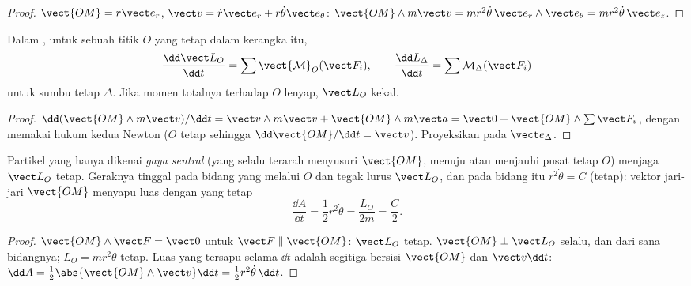 \begin{proof}
$\vect{OM} = r\vect e_r$, $\vect v = \dot r\vect e_r + r\dot\theta\vect e_\theta$:
$\vect{OM}\wedge m\vect v = mr^2\dot\theta\,\vect e_r\wedge\vect e_\theta = mr^2\dot\theta\,\vect e_z$.
\end{proof}

\begin{theorem}\label{thm:b1:angular-momentum:theorem}
Dalam , untuk sebuah titik $O$ yang tetap dalam
kerangka itu,
\[
\frac{\dd\vect L_O}{\dd t} = \sum\vect{\mathcal M}_O(\vect F_i),
\qquad
\frac{\dd L_\Delta}{\dd t} = \sum\mathcal M_\Delta(\vect F_i)
\]
untuk sumbu tetap $\Delta$. Jika momen totalnya terhadap $O$ lenyap,
$\vect L_O$ kekal.
\end{theorem}

\begin{proof}
$\dd(\vect{OM}\wedge m\vect v)/\dd t = \vect v\wedge m\vect v + \vect{OM}\wedge m\vect a
= \vect 0 + \vect{OM}\wedge\sum\vect F_i$, dengan memakai hukum kedua Newton
($O$ tetap sehingga $\dd\vect{OM}/\dd t = \vect v$). Proyeksikan pada $\vect e_\Delta$.
\end{proof}

\begin{corollary}\label{cor:b1:angular-momentum:central}
Partikel yang hanya dikenai \emph{gaya sentral} (yang selalu terarah
menyusuri $\vect{OM}$, menuju atau menjauhi pusat tetap $O$) menjaga
$\vect L_O$ tetap. Geraknya tinggal pada bidang yang melalui $O$ dan
tegak lurus $\vect L_O$, dan pada bidang itu $r^2\dot\theta = C$
(tetap): vektor jari-jari $\vect{OM}$ menyapu luas dengan
\emph{} yang tetap
\[
\frac{\dd A}{\dd t} = \frac12 r^2\dot\theta = \frac{L_O}{2m} = \frac{C}{2} .
\]
\end{corollary}

\begin{proof}
$\vect{OM}\wedge\vect F = \vect 0$ untuk $\vect F \parallel \vect{OM}$:
$\vect L_O$ tetap. $\vect{OM}\perp\vect L_O$ selalu, dan dari sana
bidangnya; $L_O =
mr^2\dot\theta$ tetap. Luas yang tersapu selama $\dd t$ adalah segitiga
bersisi $\vect{OM}$ dan $\vect v\dd t$: $\dd A = \tfrac12\abs{\vect{OM}
\wedge\vect v}\dd t = \tfrac12 r^2\dot\theta\,\dd t$.
\end{proof}

